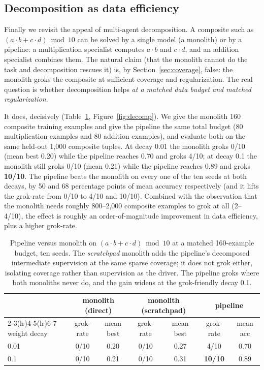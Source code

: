 \documentclass[10pt]{article} %
\begin{document}
\subsection{Decomposition as data efficiency}
\label{sec:decomp}

Finally we revisit the appeal of multi-agent decomposition. A composite such as
$(a\cdot b + c\cdot d)\bmod 10$ can be solved by a single model (a monolith) or by a pipeline: a
multiplication specialist computes $a\cdot b$ and $c\cdot d$, and an addition specialist combines
them. The natural claim (that the monolith cannot do the task and decomposition rescues it) is, by
Section~\ref{sec:coverage}, false: the monolith groks the composite at sufficient coverage and
regularization. The real question is whether decomposition helps \emph{at a matched data budget
and matched regularization}.

It does, decisively (Table~\ref{tab:decomp}, Figure~\ref{fig:decomp}). We give the monolith 160
composite training examples and give the pipeline the same total budget (80 multiplication examples
and 80 addition examples), and evaluate both on the same held-out 1{,}000 composite tuples. At
decay 0.01 the monolith groks 0/10 (mean best 0.20) while the pipeline reaches 0.70 and groks
4/10; at decay 0.1 the monolith still groks 0/10 (mean 0.21) while the pipeline reaches 0.89 and
groks \textbf{10/10}. The pipeline beats the monolith on every one of the ten seeds at both decays,
by 50 and 68 percentage points of mean accuracy respectively (and it lifts the grok-rate from 0/10
to 4/10 and 10/10). Combined with the observation that the monolith needs roughly 800--2{,}000
composite examples to grok at all (2--4/10), the effect is roughly an order-of-magnitude improvement
in data efficiency, plus a higher grok-rate.

\begin{table}[t]
\caption{Pipeline versus monolith on $(a\cdot b + c\cdot d)\bmod 10$ at a matched 160-example
budget, ten seeds. The \emph{scratchpad} monolith adds the pipeline's decomposed intermediate
supervision at the same sparse coverage; it does not grok either, isolating coverage rather than
supervision as the driver. The pipeline groks where both monoliths never do, and the gain widens at
the grok-friendly decay 0.1.}
\label{tab:decomp}
\begin{center}
\begin{tabular}{lcccccc}
\toprule
 & \multicolumn{2}{c}{monolith (direct)} & \multicolumn{2}{c}{monolith (scratchpad)} & \multicolumn{2}{c}{pipeline} \\
\cmidrule(lr){2-3}\cmidrule(lr){4-5}\cmidrule(lr){6-7}
weight decay & grok-rate & mean best & grok-rate & mean best & grok-rate & mean acc \\
\midrule
0.01 & 0/10 & 0.20 & 0/10 & 0.27 & 4/10          & 0.70 \\
0.1  & 0/10 & 0.21 & 0/10 & 0.31 & \textbf{10/10} & 0.89 \\
\bottomrule
\end{tabular}
\end{center}
\end{table}
\end{document}
